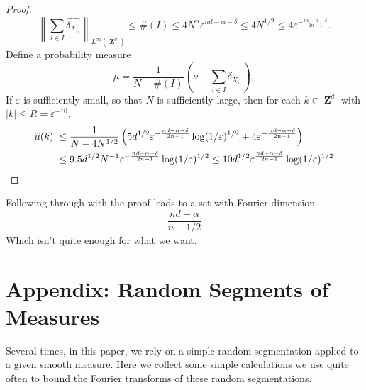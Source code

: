 \documentclass[12pt,reqno]{article}
\numberwithin{equation}{section}
\DeclareMathOperator{\ZZ}{\mathbf{Z}}
\begin{document}
\begin{proof}
    \[ \left\| \sum_{i \in I} \widehat{\delta_{X_{i_1}}} \right\|_{L^\infty(\ZZ^d)} \leq \#(I) \leq 4 N^n \varepsilon^{nd - \alpha - \delta} \leq 4 N^{1/2} \leq 4 \varepsilon^{- \frac{nd - \alpha - \delta}{2n - 1}}. \]
    Define a probability measure
    \[ \mu = \frac{1}{N - \#(I)} \left( \nu - \sum_{i \in I} \delta_{X_{i_1}} \right), \]
    If $\varepsilon$ is sufficiently small, so that $N$ is sufficiently large, then for each $k \in \ZZ^d$ with $|k| \leq R = \varepsilon^{-10}$,
    \begin{align*}
        |\widehat{\mu}(k)| &\leq \frac{1}{N - 4N^{1/2}} \left( 5d^{1/2} \varepsilon^{- \frac{nd - \alpha - \delta}{2n - 1}} \log(1/\varepsilon)^{1/2} +  4 \varepsilon^{- \frac{nd - \alpha - \delta}{2n - 1}} \right)\\
        &\leq 9.5 d^{1/2} N^{-1} \varepsilon^{- \frac{nd - \alpha - \delta}{2n - 1}} \log(1/\varepsilon)^{1/2} \leq 10 d^{1/2} \varepsilon^{\frac{nd - \alpha - \delta}{2n - 1}} \log(1/\varepsilon)^{1/2}. \qedhere
    \end{align*}
\end{proof}

Following through with the proof leads to a set with Fourier dimension
%
\[ \frac{nd - \alpha}{n - 1/2} \]
%
Which isn't quite enough for what we want.



\section{Appendix: Random Segments of Measures}

Several times, in this paper, we rely on a simple random segmentation applied to a given smooth measure. Here we collect some simple calculations we use quite often to bound the Fourier transforms of these random segmentations.
\end{document}
